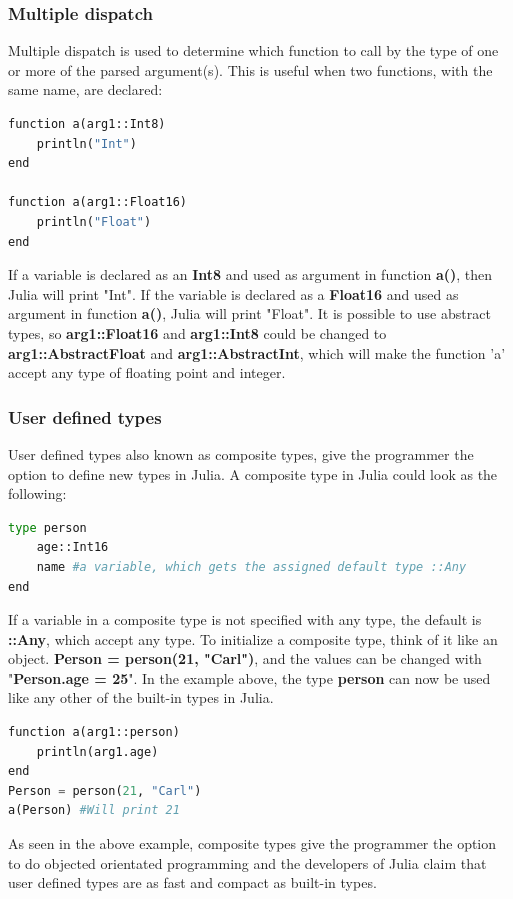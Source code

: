 \documentclass[a4paper, 11pt, titlepage]{article}
\begin{document}
\subsubsection{Multiple dispatch}
Multiple dispatch is used to determine which function to call by the type of one or more of the parsed argument(s). This is useful when two functions, with the same name, are declared:

\begin{lstlisting}[language=python]
function a(arg1::Int8)
	println("Int")  
end

function a(arg1::Float16)  
	println("Float")  
end    
\end{lstlisting}
If a variable is declared as an \textbf{Int8} and used as argument in function \textbf{a()}, then Julia will print "Int". If the variable is declared as a \textbf{Float16} and used as argument in function \textbf{a()}, Julia will print "Float". It is possible to use abstract types, so \textbf{arg1::Float16} and \textbf{arg1::Int8} could be changed to \textbf{arg1::AbstractFloat} and \textbf{arg1::AbstractInt}, which will make the function 'a' accept any type of floating point and integer.
\subsubsection{User defined types}
User defined types also known as composite types, give the programmer the option to define new types in Julia. A composite type in Julia could look as the following: 
\begin{lstlisting}[language=python]
type person 
	age::Int16 
	name #a variable, which gets the assigned default type ::Any
end    
\end{lstlisting}
If a variable in a composite type is not specified with any type, the default is \textbf{::Any}, which accept any type. To initialize a composite type, think of it like an object. \textbf{Person = person(21, "Carl")}, and the values can be changed with "\textbf{Person.age = 25}".
In the example above, the type \textbf{person} can now be used like any other of the built-in types in Julia.
\begin{lstlisting}[language=python]
function a(arg1::person)
	println(arg1.age)
end
Person = person(21, "Carl")
a(Person) #Will print 21
\end{lstlisting}
As seen in the above example, composite types give the programmer the option to do objected orientated programming and the developers of Julia claim that user defined types are as fast and compact as built-in types. 
\end{document}
